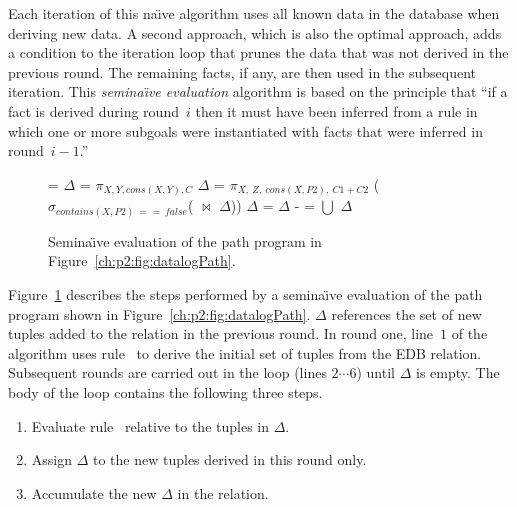 Each iteration of this na\"{\i}ve algorithm uses all known data in the database
when deriving new data.  A second approach, which is also the optimal approach,
adds a condition to the iteration loop that prunes the data that was not
derived in the previous round.  The remaining facts, if any, are then used in
the subsequent iteration.  This {\em semina\"{\i}ve evaluation} algorithm is
based on the principle that ``if a fact is derived during round~$i$ then it
must have been inferred from a rule in which one or more subgoals were
instantiated with facts that were inferred in round~$i-1$.''~\cite{ullmanbook}


\begin{figure}
\ssp
\begin{boxedminipage}{\linewidth}
    \begin{algorithmic}[1]
      \STATE {} = $\Delta$ = $\pi_{X, Y, cons(X, Y), C}$
      	\STATE $\Delta$ = $\pi_{X,\ Z,\ cons(X, P2),\ C1+C2}$ 
      	($\sigma_{contains(X,P2)\ ==\ false}$( $\Join$ $\Delta$)) 
      	\STATE $\Delta$ = $\Delta$ - 
      	\STATE {} =  $\bigcup$ $\Delta$
      \ENDWHILE
    \end{algorithmic}
\end{boxedminipage}
\caption{\label{ch:p2:fig:seminaive}Semina\"{\i}ve evaluation of the 
path program in Figure~\ref{ch:p2:fig:datalogPath}.}
\end{figure}

Figure~\ref{ch:p2:fig:seminaive} describes the steps performed by a
semina\"{\i}ve evaluation of the path program shown in
Figure~\ref{ch:p2:fig:datalogPath}.  $\Delta$ references
the set of new tuples added to the  relation in the previous round.
In round one, line~$1$ of the algorithm uses rule~ to derive the initial
set of  tuples from the EDB  relation.  Subsequent rounds are
carried out in the  loop (lines $2 \cdots 6$) until $\Delta$
is empty.  The body of the loop contains the following three steps.
\begin{enumerate} \ssp 
  \item Evaluate rule~ relative to the tuples in
    $\Delta$.  
  \item Assign $\Delta$ to the new tuples
    derived in this round only.  
  \item Accumulate the new $\Delta$ in the  relation.  
\end{enumerate}

